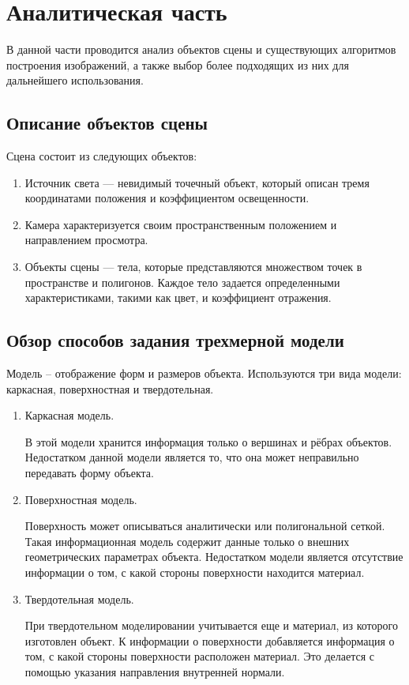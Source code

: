 	
\chapter{Аналитическая часть}

В данной части проводится анализ объектов сцены и существующих
алгоритмов построения изображений, а также выбор более подходящих из них для дальнейшего использования.

\section{Описание объектов сцены}

Сцена состоит из следующих объектов:
\begin{enumerate}[label=\arabic*)]
	\item Источник света --- невидимый точечный объект, который описан тремя координатами положения и коэффициентом освещенности.
	\item Камера характеризуется своим пространственным положением и направлением просмотра.
	\item Объекты сцены --- тела, которые представляются множеством точек в пространстве и полигонов. Каждое тело задается определенными характеристиками, такими как цвет, и коэффициент отражения.
\end{enumerate} 


\section{Обзор способов задания трехмерной модели}

Модель – отображение форм и размеров объекта.
Используются три вида модели: каркасная, поверхностная и твердотельная.
\begin{enumerate}[label=\arabic*)]
	\item Каркасная модель. 
	
	В этой модели хранится информация только о вершинах и рёбрах объектов. Недостатком данной модели является то, что она может неправильно передавать форму объекта.
	\item Поверхностная модель.
	
	Поверхность может описываться аналитически или полигональной сеткой. Такая информационная модель содержит данные только о внешних геометрических параметрах объекта. Недостатком модели является отсутствие информации о том, с какой стороны поверхности находится материал.

	\item Твердотельная модель.
	
	При твердотельном моделировании учитывается еще и материал, из которого изготовлен объект. К информации о поверхности добавляется информация о том, с какой стороны поверхности расположен материал. Это делается с помощью указания направления внутренней нормали.
\end{enumerate}


